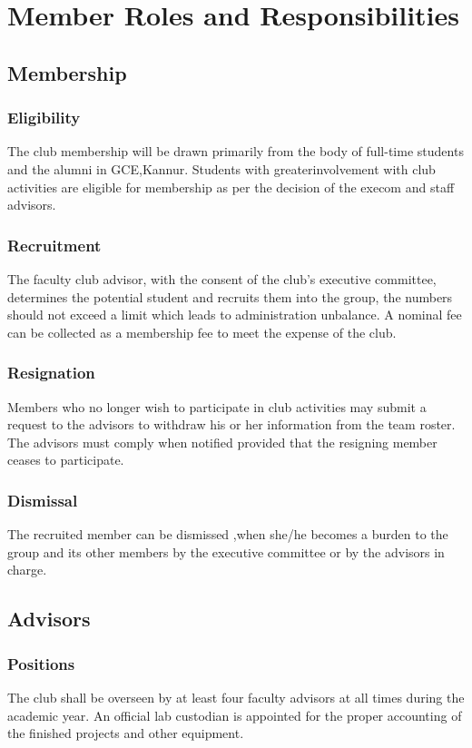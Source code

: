 \chapter{Member Roles and Responsibilities}

\section{Membership}

\subsection{Eligibility}
The club membership will be drawn primarily from the body of full-time
students and the alumni in GCE,Kannur. Students with greaterinvolvement with club activities are eligible for membership as per the
decision of the execom and staff advisors.

\subsection{Recruitment}
The faculty club advisor, with the consent of the club’s executive
committee, determines the potential student and recruits them into the
group, the numbers should not exceed a limit which leads to
administration unbalance. A nominal fee can be collected as a
membership fee to meet the expense of the club.

\subsection{Resignation}
Members who no longer wish to participate in club activities may submit a
request to the advisors to withdraw his or her information from the team
roster. The advisors must comply when notified provided that the resigning
member ceases to participate.

\subsection{Dismissal}
The recruited member can be dismissed ,when she/he becomes a burden
to the group and its other members by the executive committee or by the
advisors in charge.

\section{Advisors}

\subsection{Positions}
The club shall be overseen by at least four faculty advisors at all times
during the academic year. An official lab custodian is appointed for the
proper accounting of the finished projects and other equipment.

